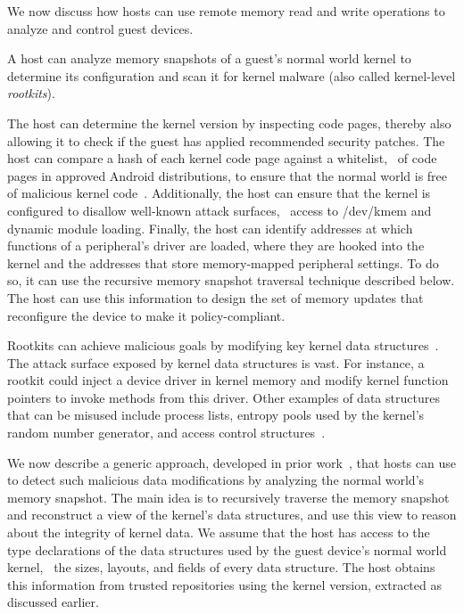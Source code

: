 \label{section:policy}

We now discuss how hosts can use remote memory read and write operations to
analyze and control guest devices.

%
A host can analyze memory snapshots of a guest's normal world kernel to
determine its configuration and scan it for kernel malware (also called
kernel-level \textit{rootkits}).

\begin{mylist}
%
\item {} The host can determine the
kernel version by inspecting code pages, thereby also allowing it to check if
the guest has applied recommended security patches. The host can compare a hash
of each kernel code page against a whitelist, \eg~of code pages in approved
Android distributions, to ensure that the normal world is free of malicious
kernel code~\cite{patagonix:sec08,secvisor:sosp07}. Additionally, the host can
ensure that the kernel is configured to disallow well-known attack surfaces,
\eg~access to \textsf{/dev/kmem} and dynamic module loading. Finally, the host
can identify addresses at which functions of a peripheral's driver are loaded,
where they are hooked into the kernel and the addresses that store
memory-mapped peripheral settings. To do so, it can use the recursive memory
snapshot traversal technique described below. The host can use this information
to design the set of memory updates that reconfigure the device to make it
policy-compliant.
%
\item {} Rootkits can achieve
malicious goals by modifying key kernel data
structures~\cite{sbcfi:ccs07,shadows:oakland07,specmon:usenix06}.  The attack
surface exposed by kernel data structures is vast.  For instance, a rootkit
could inject a device driver in kernel memory and modify kernel function
pointers to invoke methods from this driver.  Other examples of data structures
that can be misused include process lists, entropy pools used by the kernel's
random number generator, and access control
structures~\cite{shadows:oakland07,specmon:usenix06}.  
%
\end{mylist}

We now describe a generic approach, developed in prior
work~\cite{sbcfi:ccs07,gib:tdsc11,kop:ccs09,kop:sec12,osck:asplos11}, that
hosts can use to detect such malicious data modifications by analyzing the
normal world's memory snapshot. The main idea is to recursively traverse the
memory snapshot and reconstruct a view of the kernel's data structures, and use
this view to reason about the integrity of kernel data. We assume that the host
has access to the type declarations of the data structures used by the guest
device's normal world kernel, \eg~the sizes, layouts, and fields of every data
structure. The host obtains this information from trusted repositories using
the kernel version, extracted as discussed earlier.

